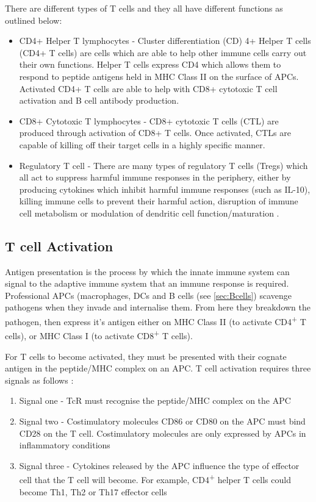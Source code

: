 There are different types of T cells and they all have different functions as outlined below:


\begin{itemize}
\item CD4+ Helper T lymphocytes - Cluster differentiation (CD) 4+ Helper T cells (CD4+ T cells) are cells which are able to help other immune cells carry out their own functions. 
Helper T cells express CD4 which allows them to respond to peptide antigens held in MHC Class II on the surface of APCs. 
Activated CD4+ T cells are able to help with CD8+ cytotoxic T cell activation and B cell antibody production.
\item CD8+ Cytotoxic T lymphocytes - CD8+ cytotoxic T cells (CTL) are produced through activation of CD8+ T cells.
Once activated, CTLs are capable of killing off their target cells in a highly specific manner.
\item Regulatory T cell - There are many types of regulatory T cells (Tregs) which all act to suppress harmful immune responses in the periphery, either by producing cytokines which inhibit harmful immune responses (such as IL-10), killing immune cells to prevent their harmful action, disruption of immune cell metabolism or modulation of dendritic cell function/maturation \citep{Vignali2008}. 
\end{itemize}

\subsection{T cell Activation}
\label{subsec:Tcellactivation}


Antigen presentation is the process by which the innate immune system can signal to the adaptive immune system that an immune response is required.
Professional APCs (macrophages, DCs and B cells (see \cref{sec:Bcells}) scavenge pathogens when they invade and internalise them.
From here they breakdown the pathogen, then express it's antigen either on MHC Class II (to activate CD4\textsuperscript{+} T cells), or MHC Class I (to activate CD8\textsuperscript{+} T cells).

For T cells to become activated, they must be presented with their cognate antigen in the peptide/MHC complex on an APC.
T cell activation requires three signals as follows \citep{Corthay2006, Kapsenberg2003}:
\begin{enumerate}
\item Signal one - TcR must recognise the peptide/MHC complex on the APC
\item Signal two - Costimulatory molecules CD86 or CD80 on the APC must bind CD28 on the T cell. Costimulatory molecules are only expressed by APCs in inflammatory conditions
\item Signal three - Cytokines released by the APC influence the type of effector cell that the T cell will become. For example, CD4\textsuperscript{+} helper T cells could become Th1, Th2 or Th17 effector cells \citep{Kapsenberg2003}
\end{enumerate}

